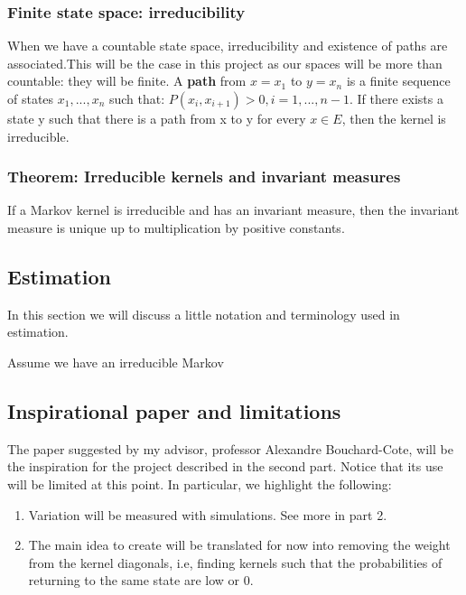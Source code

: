 \subsubsection{Finite state space: irreducibility}
When we have a countable state space, irreducibility and existence of paths are associated.This will be the case in this project as our spaces will be more than countable: they will be finite. A \textbf{path} from $x = x_1$ to $y = x_n$ is a finite sequence of states $x_1, ..., x_n$ such that:
$ P (x_i, x_{i+1}) > 0, i = 1, ... , n - 1$.
If there exists a state y such that there is a path from x to y for every $x \in E$, then the kernel is irreducible.



\subsubsection{Theorem: Irreducible kernels and invariant measures}
If a Markov kernel is irreducible and has an invariant measure, then the invariant measure is unique up to multiplication by positive constants. 






\subsection{Estimation}
In this section we will discuss a little notation and terminology used in estimation.

Assume we have an irreducible Markov




\subsection{Inspirational paper and limitations}\label{paper_section}
The paper suggested by my advisor, professor Alexandre Bouchard-Cote, will be the inspiration for the project described in the second part. Notice that its use will be limited at this point. In particular, we highlight the following:

\begin{enumerate}[label=\alph*.]
\item Variation will be measured with simulations. See more in part 2.
\item The main idea to create will be translated for now into removing the weight from the kernel diagonals, i.e, finding kernels such that the probabilities of returning to the same state are low or 0.
\end{enumerate}


